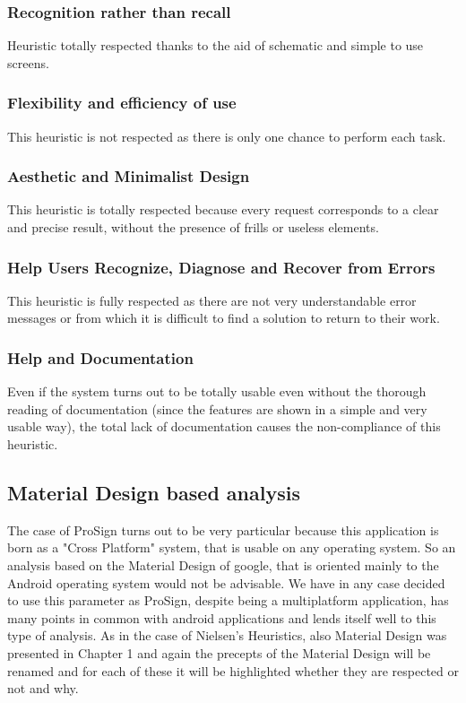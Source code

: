 \subsubsection{Recognition rather than recall}
Heuristic totally respected thanks to the aid of schematic and simple to use screens.
\subsubsection{Flexibility and efficiency of use}
This heuristic is not respected as there is only one chance to perform each task.
\subsubsection{Aesthetic and Minimalist Design}
This heuristic is totally respected because every request corresponds to a clear and precise result, without the presence of frills or useless elements.
\subsubsection{Help Users Recognize, Diagnose and Recover from Errors}
This heuristic is fully respected as there are not very understandable error messages or from which it is difficult to find a solution to return to their work.
\subsubsection{Help and Documentation}
Even if the system turns out to be totally usable even without the thorough reading of documentation (since the features are shown in a simple and very usable way), the total lack of documentation causes the non-compliance of this heuristic.

\subsection{Material Design based analysis}
The case of ProSign turns out to be very particular because this application is born as a "Cross Platform" system, that is usable on any operating system. So an analysis based on the Material Design of google, that is oriented mainly to the Android operating system would not be advisable. We have in any case decided to use this parameter as ProSign, despite being a multiplatform application, has many points in common with android applications and lends itself well to this type of analysis. As in the case of Nielsen's Heuristics, also Material Design was presented in Chapter 1 and again the precepts of the Material Design will be renamed and for each of these it will be highlighted whether they are respected or not and why.
